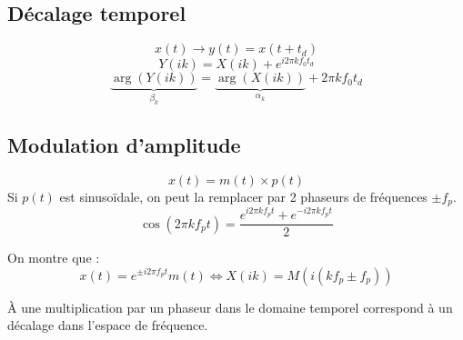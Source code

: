 \documentclass[a4paper,12pt]{article}
\begin{document}
\subsection{Décalage temporel}

\[ x(t) \longrightarrow y(t) = x(t + t_d) \]
\[ Y(ik) = X(ik) + e^{i2\pi kf_0 t_d} \]
\[ \underbrace{\arg(Y(ik))}_{\beta_k} = \underbrace{\arg(X(ik))}_{\alpha_k} + 2\pi kf_0 t_d \]

\subsection{Modulation d'amplitude}

\[ x(t) = m(t) \times p(t) \]
Si $p(t)$ est sinusoïdale, on peut la remplacer par 2 phaseurs de fréquences $\pm f_p$.
\[ \cos(2\pi kf_pt) = \dfrac{e^{i2\pi kf_pt} + e^{-i2\pi kf_pt}}{2} \]

On montre que :
\[ x(t) = e^{\pm i2\pi f_pt}m(t) \Leftrightarrow X(ik) = M(i(kf_p \pm f_p)) \]

À une multiplication par un phaseur dans le domaine temporel correspond à un décalage dans l'espace de fréquence.
\end{document}
